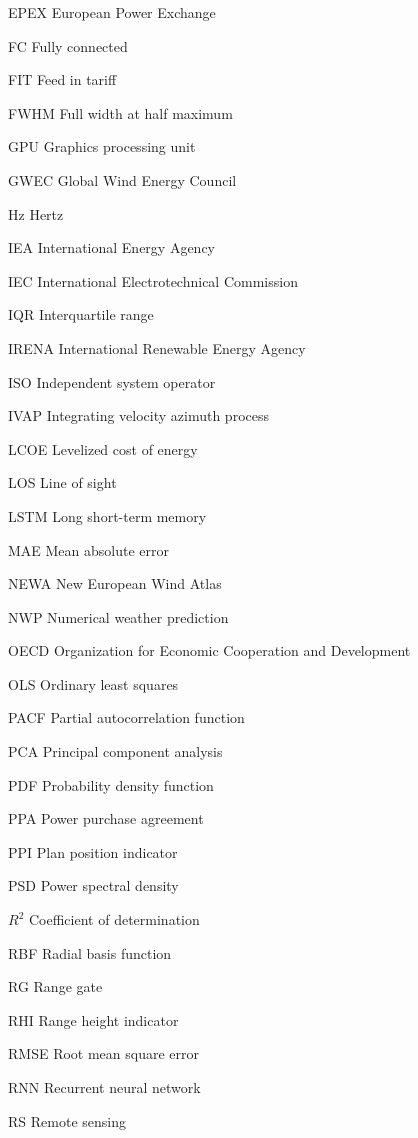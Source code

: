 \begin{abbreviations}
\item[EPEX] European Power Exchange

\item[FC] Fully connected 
\item[FIT] Feed in tariff
\item[FWHM] Full width at half maximum

\item[GPU] Graphics processing unit
\item[GWEC] Global Wind Energy Council

\item[Hz] Hertz

\item[IEA] International Energy Agency
\item[IEC] International Electrotechnical Commission
\item[IQR] Interquartile range
\item[IRENA] International Renewable Energy Agency
\item[ISO] Independent system operator
\item[IVAP] Integrating velocity azimuth process

\item[LCOE] Levelized cost of energy
\item[LOS] Line of sight
\item[LSTM] Long short-term memory

\item[MAE] Mean absolute error

\item[NEWA] New European Wind Atlas
\item[NWP] Numerical weather prediction

\item[OECD] Organization for Economic Cooperation and Development
\item[OLS] Ordinary least squares 

\item[PACF] Partial autocorrelation function
\item[PCA] Principal component analysis
\item[PDF] Probability density function
\item[PPA] Power purchase agreement
\item[PPI] Plan position indicator
\item[PSD] Power spectral density

\item[$R^2$] Coefficient of determination
\item[RBF] Radial basis function
\item[RG] Range gate
\item[RHI] Range height indicator
\item[RMSE] Root mean square error
\item[RNN] Recurrent neural network
\item[RS] Remote sensing


\end{abbreviations}
